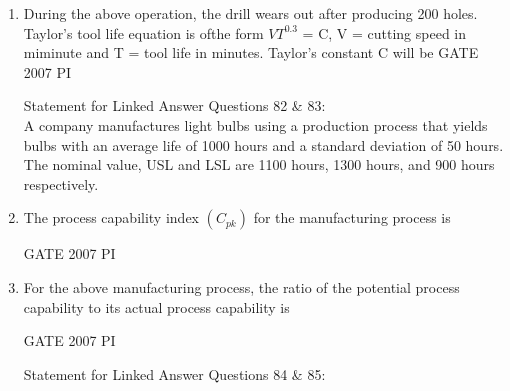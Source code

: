 \documentclass[journal,12pt,onecolumn]{IEEEtran}
\theoremstyle{remark}
\begin{document}
\begin{enumerate}
    \item 
    During the above operation, the drill wears out after producing 200 holes. Taylor's tool life equation is ofthe form $VT^{0.3}$
 = C, V = cutting speed in miminute and T = tool life in minutes. Taylor's constant C will be
    \hfill{GATE 2007 PI}
    \begin{enumerate}
        \end{enumerate}
        {Statement for Linked Answer Questions  82 \& 83:}\\
        
        A company manufactures light bulbs using a production process that yields bulbs with an average life of 1000 hours and a standard deviation of 50 hours. The nominal value, USL and LSL are 1100 hours, 1300 hours, and 900 hours respectively.\\
        
        
        \item 
        The process capability index $(C_{pk})$ for the manufacturing process is
        
\hfill{GATE 2007 PI}
\begin{enumerate}
    \end{enumerate}
    
    \item 
 For the above manufacturing process, the ratio of the potential process capability to its actual process capability is
 
 \hfill{GATE 2007 PI}
 \begin{enumerate}
 \end{enumerate}
 {Statement for Linked Answer Questions 84 \& 85:}\\
 

\end{enumerate}
\end{document}
